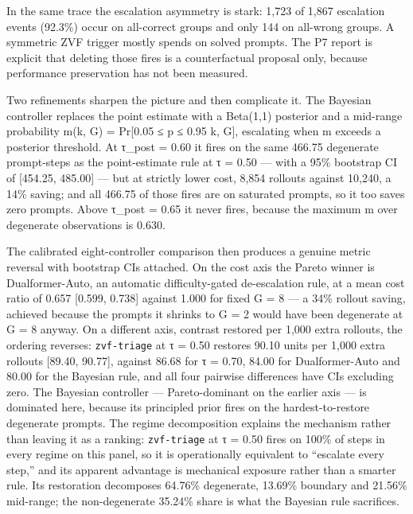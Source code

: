 \documentclass[12pt,a4paper]{report}
\begin{document}
In the same trace the escalation asymmetry is stark: 1,723 of 1,867
escalation events (92.3\%) occur on all-correct groups and only 144 on
all-wrong groups. A symmetric ZVF trigger mostly spends on solved
prompts. The P7 report is explicit that deleting those fires is a
counterfactual proposal only, because performance preservation has not
been measured.

Two refinements sharpen the picture and then complicate it. The Bayesian
controller replaces the point estimate with a Beta(1,1) posterior and a
mid-range probability m(k, G) = Pr{[}0.05 ≤ p ≤ 0.95 \textbar{} k, G{]},
escalating when m exceeds a posterior threshold. At τ\_post = 0.60 it
fires on the same 466.75 degenerate prompt-steps as the point-estimate
rule at τ = 0.50 --- with a 95\% bootstrap CI of {[}454.25, 485.00{]}
--- but at strictly lower cost, 8,854 rollouts against 10,240, a 14\%
saving; and all 466.75 of those fires are on saturated prompts, so it
too saves zero prompts. Above τ\_post = 0.65 it never fires, because the
maximum m over degenerate observations is 0.630.

The calibrated eight-controller comparison then produces a genuine
metric reversal with bootstrap CIs attached. On the cost axis the Pareto
winner is Dualformer-Auto, an automatic difficulty-gated de-escalation
rule, at a mean cost ratio of 0.657 {[}0.599, 0.738{]} against 1.000 for
fixed G = 8 --- a 34\% rollout saving, achieved because the prompts it
shrinks to G = 2 would have been degenerate at G = 8 anyway. On a
different axis, contrast restored per 1,000 extra rollouts, the ordering
reverses: \texttt{zvf-triage} at τ = 0.50 restores 90.10 units per 1,000
extra rollouts {[}89.40, 90.77{]}, against 86.68 for τ = 0.70, 84.00 for
Dualformer-Auto and 80.00 for the Bayesian rule, and all four pairwise
differences have CIs excluding zero. The Bayesian controller ---
Pareto-dominant on the earlier axis --- is dominated here, because its
principled prior fires on the hardest-to-restore degenerate prompts. The
regime decomposition explains the mechanism rather than leaving it as a
ranking: \texttt{zvf-triage} at τ = 0.50 fires on 100\% of steps in
every regime on this panel, so it is operationally equivalent to
``escalate every step,'' and its apparent advantage is mechanical
exposure rather than a smarter rule. Its restoration decomposes 64.76\%
degenerate, 13.69\% boundary and 21.56\% mid-range; the non-degenerate
35.24\% share is what the Bayesian rule sacrifices.
\end{document}
